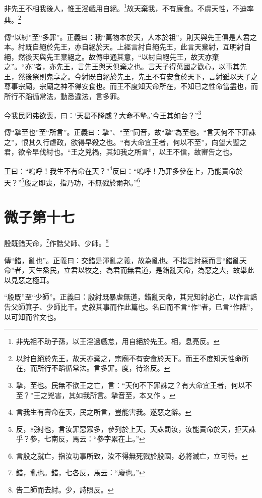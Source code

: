 非先王不相我後人，惟王淫戲用自絕。\footnote{非先祖不助子孫，以王淫過戲怠，用自絕於先王。相，息亮反。}故天棄我，不有康食。不虞天性，不迪率典。\footnote{以紂自絕於先王，故天亦棄之，宗廟不有安食於天下。而王不度知天性命所在，而所行不蹈循常法。言多罪。度，待洛反。}

{\noindent\zhuan{}\fzbyks 傳“以紂”至“多罪”。正義曰：稱“萬物本於天，人本於祖”，則天與先王俱是人君之本。紂既自絕於先王，亦自絕於天。上經言紂自絕先王，此言天棄紂，互明紂自絕，然後天與先王棄絕之。故傳申通其意，“以紂自絕先王，故天亦棄之”。“亦”者，亦先王，言先王與天俱棄之也。言天子得萬國之歡心，以事其先王，然後祭則鬼享之。今紂既自絕於先王，先王不有安食於天下，言紂雖以天子之尊事宗廟，宗廟之神不得安食也。而王不度知天命所在，不知已之性命當盡也，而所行不蹈循常法，動悉違法，言多罪。 \par}

今我民罔弗欲喪，曰：‘天曷不降威？大命不摯。’今王其如台？”\footnote{摯，至也。民無不欲王之亡，言：“天何不下罪誅之？有大命宜王者，何以不至？”王之兇害，其如我所言。摯音至，本又作𡠗。}

{\noindent\zhuan{}\fzbyks 傳“摯至也”至“所言”。正義曰：摯”、“至”同音，故“摯”為至也。“言天何不下罪誅之”，恨其久行虐政，欲得早殺之也。“有大命宜王者，何以不至”，向望大聖之君，欲令早伐紂也。“王之兇禍，其如我之所言”，以王不信，故審告之也。 \par}

王曰：“嗚呼！我生不有命在天？”\footnote{言我生有壽命在天，民之所言，豈能害我。遂惡之辭。}反曰：“嗚呼！乃罪多參在上，乃能責命於天？”\footnote{反，報紂也，言汝罪惡眾多，參列於上天，天誅罰汝，汝能責命於天，拒天誅乎？參，七南反，馬云：“參字累在上。”}殷之即喪，指乃功，不無戮於爾邦。”\footnote{言殷之就亡，指汝功事所致，汝不得無死戮於殷國，必將滅亡，立可待。}

\section{微子第十七}


殷既錯天命，\footnote{錯，亂也。錯，七各反，馬云：“廢也。”}作誥父師、少師。\footnote{告二師而去紂。少，詩照反。}


{\noindent\zhuan{}\fzbyks 傳“錯，亂也”。正義曰：交錯是渾亂之義，故為亂也。不指言紂惡而言“錯亂天命”者，天生烝民，立君以牧之，為君而無君道，是錯亂天命，為惡之大，故舉此以見惡之極耳。 \par}

{\noindent\shu{}\fzkt “殷既”至“少師”。正義曰：殷紂既暴虐無道，錯亂天命，其兄知紂必亡，以作言誥告父師箕子、少師比干。史敘其事而作此篇也。名曰而不言“作”者，已言“作誥”，以可知而省文也。 \par}

